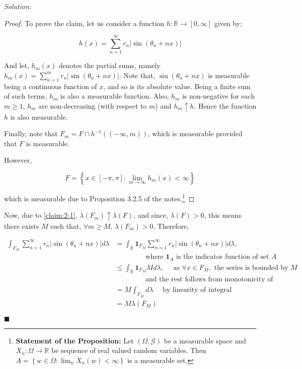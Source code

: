 \documentclass[12pt]{article}
\newcommand{\R}{\mathbb{R}}
\theoremstyle{definition}
\newenvironment{answer}{\textit{Solution: }\quad }{ \hfill $\blacksquare$}
\begin{document}
\begin{answer}
	\begin{proof}
		To prove the claim, let us consider a function $h: \R \rightarrow [0, \infty]$ given by;

		$$h(x) = \sum_{n=1}^{\infty} r_n \vert \sin (\theta_n + nx) \vert$$

		And let, $h_m(x)$ denotes the partial sums, namely $h_m(x) = \sum_{n=1}^{m} r_n \vert \sin (\theta_n + nx) \vert$. Note that, $\sin(\theta_n + nx)$ is measurable being a continuous function of $x$, and so is its absolute value. Being a finite sum of such terms, $h_m$ is also a measurable function. Also, $h_m$ is non-negative for each $m \geq 1$, $h_m$ are non-decreasing (with respect to $m$) and $h_m \uparrow h$. Hence the function $h$ is also measurable. 

		Finally, note that $F_m = F \cap h^{-1}((-\infty, m))$, which is measurable provided that $F$ is measurable.

		However,

		$$F = \left\{ x\in [-\pi, \pi] : \lim_{m \rightarrow \infty} h_m(x) < \infty \right\}$$

		which is measurable due to Proposition 3.2.5 of the notes.\footnote{\textbf{Statement of the Proposition:} Let $(\Omega, \mathcal{G})$ be a measurable space and $X_n : \Omega \rightarrow \R$ be sequence of real valued random variables. Then $A = \left\{ w \in \Omega : \lim_{n} X_n(w) < \infty \right\}$ is a measurable set.}
	\end{proof}

	Now, due to \cref{claim:2-1}, $\lambda(F_m) \uparrow \lambda(F)$, and since, $\lambda(F) > 0$, this means there exists $M$ such that, $\forall m \geq M$, $\lambda(F_m) > 0$. Therefore,

	\begin{equation}
		\label{eqn:2-1}
		\begin{split}
		\int_{F_M} \sum_{n = 1}^{\infty} r_n \vert \sin (\theta_n + nx) \vert d\lambda
		& = \int_{\R} \bm{1}_{F_M} \sum_{n = 1}^{\infty} r_n \vert \sin (\theta_n + nx) \vert d\lambda,\\
		& \qquad \qquad \text{ where } \bm{1}_A \text{ is the indicator function of set } A \\
		& \leq \int_{\R} \bm{1}_{F_M} M d\lambda, \quad \text{ as } \forall x \in F_M, \text{ the series is bounded by } M\\
		& \qquad \qquad \text{ and the rest follows from monotonicity of integral}\\
		& = M \int_{F_M} d\lambda \quad \text{ by linearity of integral}\\
		& = M \lambda(F_M)
		\end{split}
	\end{equation}


\end{answer}
\end{document}
